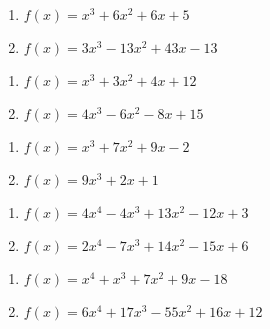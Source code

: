 \begin{multicols}{2}
\begin{enumerate}
\setcounter{enumi}{\value{HW}}

\item $f(x) = x^{3} + 6x^{2} + 6x + 5$
\item $f(x) = 3x^{3} - 13x^{2} + 43x - 13$

\setcounter{HW}{\value{enumi}}
\end{enumerate}
\end{multicols}

\begin{multicols}{2}
\begin{enumerate}
\setcounter{enumi}{\value{HW}}

\item $f(x) = x^3 + 3x^2 + 4x + 12$
\item $f(x) = 4x^3-6x^2-8x+15$

\setcounter{HW}{\value{enumi}}
\end{enumerate}
\end{multicols}

\begin{multicols}{2}
\begin{enumerate}
\setcounter{enumi}{\value{HW}}


\item  $f(x) = x^3 + 7x^2+9x-2$
\item  $f(x) = 9x^3+2x+1$

\setcounter{HW}{\value{enumi}}
\end{enumerate}
\end{multicols}


\begin{multicols}{2}
\begin{enumerate}
\setcounter{enumi}{\value{HW}}

\item $f(x) = 4x^{4} - 4x^{3} + 13x^{2} - 12x + 3$
\item $f(x) = 2x^4-7x^3+14x^2-15x+6$



\setcounter{HW}{\value{enumi}}
\end{enumerate}
\end{multicols}

\begin{multicols}{2}
\begin{enumerate}
\setcounter{enumi}{\value{HW}}

\item  $f(x) = x^4+x^3+7x^2+9x-18$
\item  $f(x) = 6x^4+17x^3-55x^2+16x+12$


\setcounter{HW}{\value{enumi}}
\end{enumerate}
\end{multicols}


